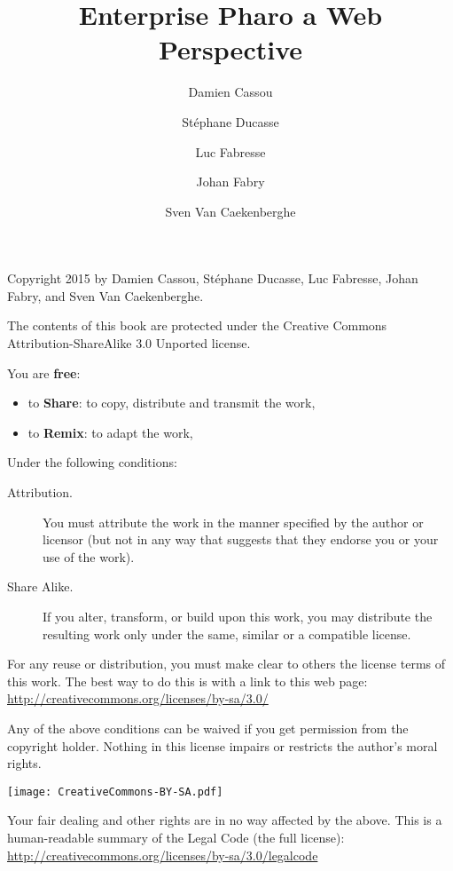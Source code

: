 \documentclass[10pt,twoside,english,showtrims]{support/latex/sbabook/sbabook}
\title{Enterprise Pharo\titlebreak{:} a Web Perspective}
\author{
    Damien Cassou \and
    Stéphane Ducasse \and
    Luc Fabresse \and
    Johan Fabry \and
    Sven Van Caekenberghe}
\date{\gitdate\titlebreak[\smallskip]{ -- }\protect\gitCommitInfo}
\begin{document}
\maketitle
\pagestyle{titlingpage}
\thispagestyle{titlingpage} %

\cleartoverso
{\small

  Copyright 2015 by Damien Cassou, Stéphane Ducasse, Luc Fabresse, Johan Fabry,
  and Sven Van Caekenberghe.

  The contents of this book are protected under the Creative Commons
  Attribution-ShareAlike 3.0 Unported license.

  You are \textbf{free}:
  \begin{itemize}
  \item to \textbf{Share}: to copy, distribute and transmit the work,
  \item to \textbf{Remix}: to adapt the work,
  \end{itemize}

  Under the following conditions:
  \begin{description}
  \item[Attribution.] You must attribute the work in the manner specified by the
    author or licensor (but not in any way that suggests that they endorse you
    or your use of the work).
  \item[Share Alike.] If you alter, transform, or build upon this work, you may
    distribute the resulting work only under the same, similar or a compatible
    license.
  \end{description}

  For any reuse or distribution, you must make clear to others the
  license terms of this work. The best way to do this is with a link to
  this web page: \\
  \url{http://creativecommons.org/licenses/by-sa/3.0/}

  Any of the above conditions can be waived if you get permission from
  the copyright holder. Nothing in this license impairs or restricts the
  author's moral rights.

  \begin{center}
    \texttt{[image: CreativeCommons-BY-SA.pdf]}
  \end{center}

  Your fair dealing and other rights are in no way affected by the
  above. This is a human-readable summary of the Legal Code (the full
  license): \\
  \url{http://creativecommons.org/licenses/by-sa/3.0/legalcode}

}
\end{document}
